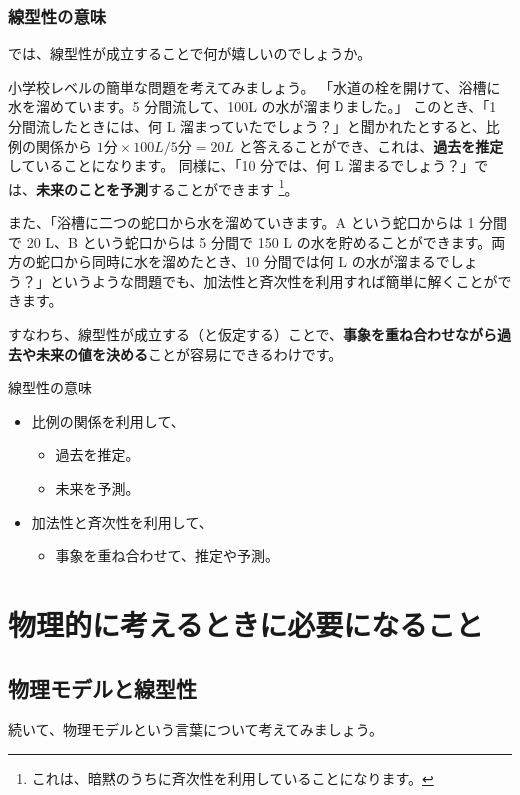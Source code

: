 \documentclass[uplatex,dvipdfmx,a4paper,11pt]{jsarticle}
\begin{document}
\subsubsection{線型性の意味}

では、線型性が成立することで何が嬉しいのでしょうか。

小学校レベルの簡単な問題を考えてみましょう。
「水道の栓を開けて、浴槽に水を溜めています。5 分間流して、100L の水が溜まりました。」
このとき、「1 分間流したときには、何 L 溜まっていたでしょう？」と聞かれたとすると、比例の関係から $1 \text{分} \times 100 L /5 \text{分}= 20 L$ と答えることができ、これは、\textbf{過去を推定}していることになります。
同様に、「10 分では、何 L 溜まるでしょう？」では、\textbf{未来のことを予測}することができます
\footnote{
	これは、暗黙のうちに斉次性を利用していることになります。
}。

また、「浴槽に二つの蛇口から水を溜めていきます。A という蛇口からは 1 分間で 20 L、B という蛇口からは 5 分間で 150 L の水を貯めることができます。両方の蛇口から同時に水を溜めたとき、10 分間では何 L の水が溜まるでしょう？」というような問題でも、加法性と斉次性を利用すれば簡単に解くことができます。

すなわち、線型性が成立する（と仮定する）ことで、\textbf{事象を重ね合わせながら過去や未来の値を決める}ことが容易にできるわけです。
\large
	\begin{itembox}[l]{線型性の意味}
		\begin{itemize}
			\item 比例の関係を利用して、
			\begin{itemize}
				\item 過去を推定。
				\item 未来を予測。
			\end{itemize}
			\item 加法性と斉次性を利用して、
			\begin{itemize}
				\item 事象を重ね合わせて、推定や予測。
			\end{itemize}
		\end{itemize}
	\end{itembox}
\normalsize

\section{物理的に考えるときに必要になること}

\subsection{物理モデルと線型性}
続いて、物理モデルという言葉について考えてみましょう。
\end{document}
